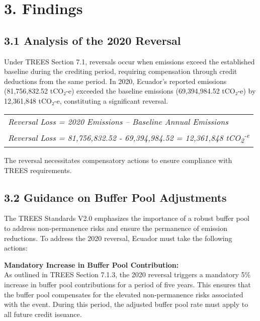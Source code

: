 \documentclass[
  letterpaper,
  DIV=11,
  numbers=noendperiod]{scrartcl}
\begin{document}
\hypertarget{findings}{%
\section{\texorpdfstring{3.
\textbf{Findings}}{3. Findings}}\label{findings}}

\hypertarget{analysis-of-the-2020-reversal}{%
\subsection{3.1 Analysis of the 2020
Reversal}\label{analysis-of-the-2020-reversal}}

Under TREES Section 7.1, reversals occur when emissions exceed the
established baseline during the crediting period, requiring compensation
through credit deductions from the same period. In 2020, Ecuador's
reported emissions (81,756,832.52 tCO₂-e) exceeded the baseline
emissions (69,394,984.52 tCO₂-e) by 12,361,848 tCO₂-e, constituting a
significant reversal\hspace{0pt}\hspace{0pt}.

\begin{longtable}[]{@{}
  >{\centering\arraybackslash}p{}@{}}
\toprule\noalign{}
\endhead
\bottomrule\noalign{}
\endlastfoot
\emph{Reversal Loss = 2020 Emissions -- Baseline Annual Emissions} \\
\emph{Reversal Loss = 81,756,832.52 - 69,394,984.52 = 12,361,848
tCO\textsubscript{2}\textsuperscript{-e}} \\
\end{longtable}

The reversal necessitates compensatory actions to ensure compliance with
TREES requirements.

\hypertarget{guidance-on-buffer-pool-adjustments}{%
\subsection{\texorpdfstring{\textbf{3.2 Guidance on Buffer Pool
Adjustments}}{3.2 Guidance on Buffer Pool Adjustments}}\label{guidance-on-buffer-pool-adjustments}}

The TREES Standards V2.0 emphasizes the importance of a robust buffer
pool to address non-permanence risks and ensure the permanence of
emission reductions. To address the 2020 reversal, Ecuador must take the
following actions:

\textbf{Mandatory Increase in Buffer Pool Contribution:}\\
As outlined in TREES Section 7.1.3, the 2020 reversal triggers a
mandatory 5\% increase in buffer pool contributions for a period of five
years. This ensures that the buffer pool compensates for the elevated
non-permanence risks associated with the event. During this period, the
adjusted buffer pool rate must apply to all future credit issuance.
\end{document}
